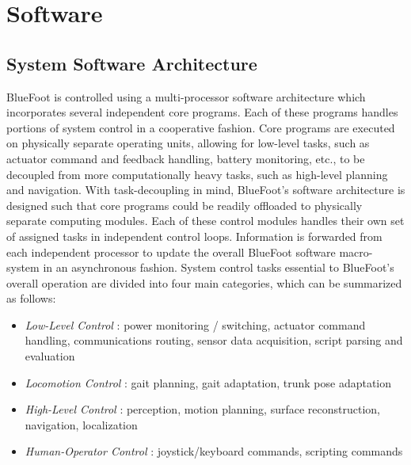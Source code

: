 
\chapter{Software}
	\label{ch::software}
	
	\section{System Software Architecture}
	
	BlueFoot is controlled using a multi-processor software architecture which incorporates several independent core programs. Each of these programs handles portions of system control in a cooperative fashion. Core programs are executed on physically separate operating units, allowing for low-level tasks, such as actuator command and feedback handling, battery monitoring, etc., to be decoupled from more computationally heavy tasks, such as high-level planning and navigation. With task-decoupling in mind, BlueFoot's software architecture is designed such that core programs could be readily offloaded to physically separate computing modules. Each of these control modules handles their own set of assigned tasks in independent control loops. Information is forwarded from each independent processor to update the overall BlueFoot software macro-system in an asynchronous fashion. System control tasks essential to BlueFoot's overall operation are divided into four main categories, which can be summarized as follows:
		\begin{itemize}
			\item{
			\emph{Low-Level Control} : 
				power monitoring / switching, 
				actuator command handling, 
				communications routing,
				sensor data acquisition,
				script parsing and evaluation
			}
			\item{
			\emph{Locomotion Control} : 
				gait planning, 
				gait adaptation, 
				trunk pose adaptation
			}
			\item{
			\emph{High-Level Control} : 
				perception, 
				motion planning, 
				surface reconstruction, 
				navigation, 
				localization
			}
			\item{
			\emph{Human-Operator Control} : 
				joystick/keyboard commands,
				scripting commands
			}
		\end{itemize}
